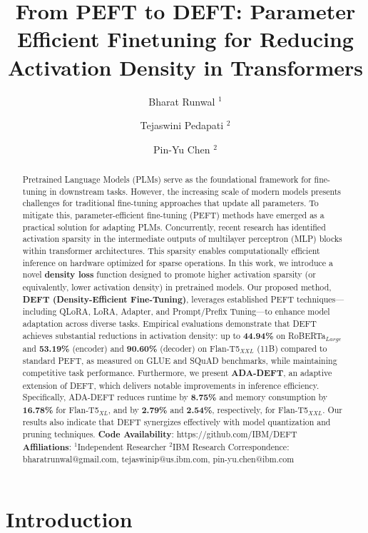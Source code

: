 \documentclass[11pt,a4paper]{article}
\title{From PEFT to DEFT: Parameter Efficient Finetuning for Reducing Activation Density in Transformers}
\author{Bharat Runwal \(^{1}\) \and Tejaswini Pedapati \(^{2}\) \and Pin-Yu Chen \(^{2}\)}
\date{}
\begin{document}
\maketitle

\begin{abstract}
Pretrained Language Models (PLMs) serve as the foundational framework for fine-tuning in downstream tasks. However, the increasing scale of modern models presents challenges for traditional fine-tuning approaches that update all parameters. To mitigate this, parameter-efficient fine-tuning (PEFT) methods have emerged as a practical solution for adapting PLMs. Concurrently, recent research has identified activation sparsity in the intermediate outputs of multilayer perceptron (MLP) blocks within transformer architectures. This sparsity enables computationally efficient inference on hardware optimized for sparse operations. In this work, we introduce a novel \textbf{density loss} function designed to promote higher activation sparsity (or equivalently, lower activation density) in pretrained models. Our proposed method, \textbf{DEFT (Density-Efficient Fine-Tuning)}, leverages established PEFT techniques—including QLoRA, LoRA, Adapter, and Prompt/Prefix Tuning—to enhance model adaptation across diverse tasks. Empirical evaluations demonstrate that DEFT achieves substantial reductions in activation density: up to \textbf{44.94\%} on RoBERTa\(_{Large}\) and \textbf{53.19\%} (encoder) and \textbf{90.60\%} (decoder) on Flan-T5\(_{XXL}\) (11B) compared to standard PEFT, as measured on GLUE and SQuAD benchmarks, while maintaining competitive task performance. Furthermore, we present \textbf{ADA-DEFT}, an adaptive extension of DEFT, which delivers notable improvements in inference efficiency. Specifically, ADA-DEFT reduces runtime by \textbf{8.75\%} and memory consumption by \textbf{16.78\%} for Flan-T5\(_{XL}\), and by \textbf{2.79\%} and \textbf{2.54\%}, respectively, for Flan-T5\(_{XXL}\). Our results also indicate that DEFT synergizes effectively with model quantization and pruning techniques. \textbf{Code Availability}: https://github.com/IBM/DEFT \textbf{Affiliations}: \(^{1}\)Independent Researcher \(^{2}\)IBM Research Correspondence: bharatrunwal@gmail.com, tejaswinip@us.ibm.com, pin-yu.chen@ibm.com
\end{abstract}


\section{Introduction}
\end{document}
